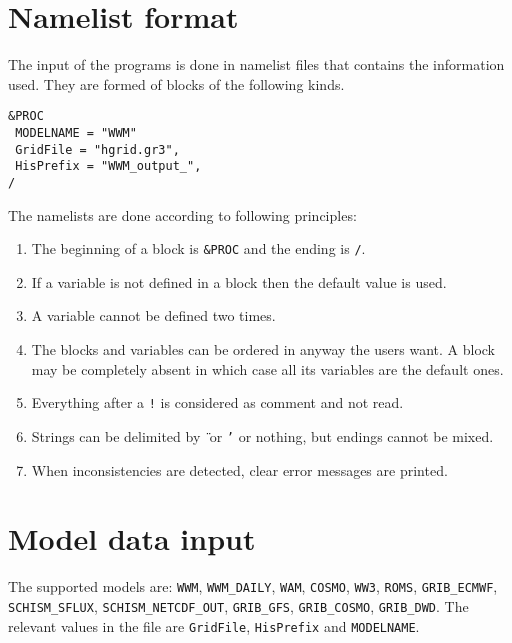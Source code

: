 \documentclass[12pt]{amsart}
\begin{document}
\section{Namelist format}

The input of the programs is done in namelist files that contains the information used.
They are formed of blocks of the following kinds.

\begin{verbatim}
&PROC
 MODELNAME = "WWM"
 GridFile = "hgrid.gr3",
 HisPrefix = "WWM_output_",
/
\end{verbatim}

The namelists are done according to following principles:
\begin{enumerate}
\item The beginning of a block is {\tt \&PROC} and the ending is {\tt /}.
\item If a variable is not defined in a block then the default value is used.
\item A variable cannot be defined two times.
\item The blocks and variables can be ordered in anyway the users want. A block may be completely absent in which case all its variables are the default ones.
\item Everything after a {\tt !} is considered as comment and not read.
\item Strings can be delimited by {\tt {\"{ }}} or {\tt '} or nothing, but endings cannot be mixed.
\item When inconsistencies are detected, clear error messages are printed.
\end{enumerate}









\section{Model data input}

The supported models are: {\tt WWM}, {\tt WWM\_DAILY}, {\tt WAM}, {\tt COSMO}, {\tt WW3}, {\tt ROMS}, {\tt GRIB\_ECMWF}, {\tt SCHISM\_SFLUX}, {\tt SCHISM\_NETCDF\_OUT}, {\tt GRIB\_GFS}, {\tt GRIB\_COSMO}, {\tt GRIB\_DWD}.
The relevant values in the file are {\tt GridFile}, {\tt HisPrefix} and {\tt MODELNAME}.
\end{document}
